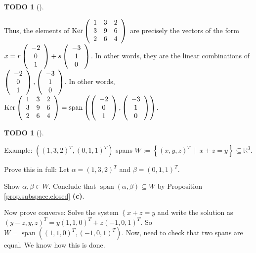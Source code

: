 \documentclass[numbers=enddot,12pt,final,onecolumn,notitlepage]{scrartcl}%
\theoremstyle{definition}
\newtheorem{quest}[theo]{TODO}
\newenvironment{todo}[1][]
{\begin{quest}[#1]\begin{leftbar}}
{\end{leftbar}\end{quest}}
\begin{document}
\begin{todo}
Thus, the elements of $\operatorname*{Ker}\left(
\begin{array}
[c]{ccc}%
1 & 3 & 2\\
3 & 9 & 6\\
2 & 6 & 4
\end{array}
\right)  $ are precisely the vectors of the form $x=r\left(
\begin{array}
[c]{c}%
-2\\
0\\
1
\end{array}
\right)  +s\left(
\begin{array}
[c]{c}%
-3\\
1\\
0
\end{array}
\right)  $. In other words, they are the linear combinations of $\left(
\begin{array}
[c]{c}%
-2\\
0\\
1
\end{array}
\right)  ,\left(
\begin{array}
[c]{c}%
-3\\
1\\
0
\end{array}
\right)  $. In other words, $\operatorname*{Ker}\left(
\begin{array}
[c]{ccc}%
1 & 3 & 2\\
3 & 9 & 6\\
2 & 6 & 4
\end{array}
\right)  =\operatorname{span}\left(  \left(
\begin{array}
[c]{c}%
-2\\
0\\
1
\end{array}
\right)  ,\left(
\begin{array}
[c]{c}%
-3\\
1\\
0
\end{array}
\right)  \right)  $.
\end{todo}

\begin{todo}
Example: $\left(  \left(  1,3,2\right)  ^{T},\left(  0,1,1\right)
^{T}\right)  $ spans $W:=\left\{  \left(  x,y,z\right)  ^{T}\ \mid
\ x+z=y\right\}  \subseteq\mathbb{R}^{3}$.

Prove this in full: Let $\alpha=\left(  1,3,2\right)  ^{T}$ and $\beta=\left(
0,1,1\right)  ^{T}$.

Show $\alpha,\beta\in W$. Conclude that $\operatorname{span}\left(
\alpha,\beta\right)  \subseteq W$ by Proposition \ref{prop.subspace.closed}
\textbf{(c)}.

Now prove converse: Solve the system $\left\{  x+z=y\right.  $ and write the
solution as $\left(  y-z,y,z\right)  ^{T}=y\left(  1,1,0\right)  ^{T}+z\left(
-1,0,1\right)  ^{T}$. So $W=\operatorname{span}\left(  \left(  1,1,0\right)
^{T},\left(  -1,0,1\right)  ^{T}\right)  $. Now, need to check that two spans
are equal. We know how this is done.
\end{todo}
\end{document}
